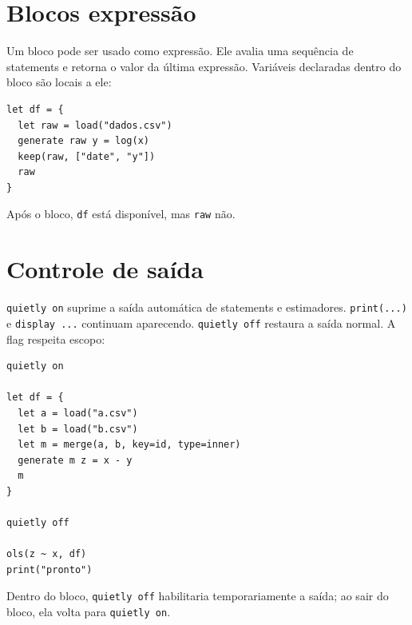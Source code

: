 \section{Blocos expressão}

Um bloco pode ser usado como expressão. Ele avalia uma sequência de statements e retorna o valor da última expressão. Variáveis declaradas dentro do bloco são locais a ele:

\begin{lstlisting}[caption={Bloco expressão retornando um valor}]
let df = {
  let raw = load("dados.csv")
  generate raw y = log(x)
  keep(raw, ["date", "y"])
  raw
}
\end{lstlisting}

Após o bloco, \lstinline{df} está disponível, mas \lstinline{raw} não.

\section{Controle de saída}

\lstinline{quietly on} suprime a saída automática de statements e estimadores. \lstinline{print(...)} e \lstinline{display ...} continuam aparecendo. \lstinline{quietly off} restaura a saída normal. A flag respeita escopo:

\begin{lstlisting}[caption={quietly on/off com escopo}]
quietly on

let df = {
  let a = load("a.csv")
  let b = load("b.csv")
  let m = merge(a, b, key=id, type=inner)
  generate m z = x - y
  m
}

quietly off

ols(z ~ x, df)
print("pronto")
\end{lstlisting}

Dentro do bloco, \lstinline{quietly off} habilitaria temporariamente a saída; ao sair do bloco, ela volta para \lstinline{quietly on}.
